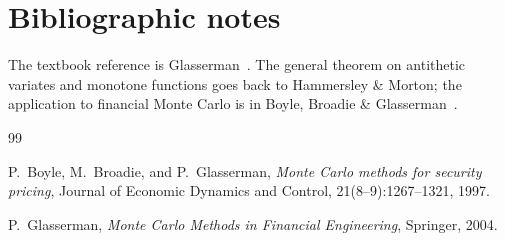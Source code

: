 \documentclass[11pt,a4paper]{article}
\theoremstyle{plain}
\theoremstyle{definition}
\theoremstyle{remark}
\begin{document}
\section{Bibliographic notes}
\label{sec:biblio}

The textbook reference is Glasserman~\cite[Section~4.2]{Glasserman}.
The general theorem on antithetic variates and monotone functions
goes back to Hammersley \& Morton; the application to financial Monte
Carlo is in Boyle, Broadie \& Glasserman~\cite{BBG1997}.

\begin{thebibliography}{99}

P.\ Boyle, M.\ Broadie, and P.\ Glasserman,
\emph{Monte Carlo methods for security pricing},
Journal of Economic Dynamics and Control, 21(8--9):1267--1321, 1997.

P.\ Glasserman,
\emph{Monte Carlo Methods in Financial Engineering},
Springer, 2004.

\end{thebibliography}
\end{document}
